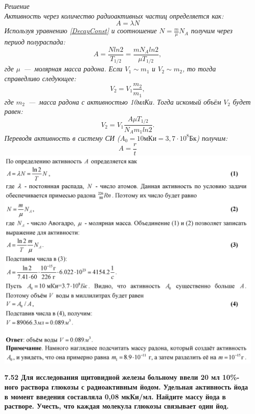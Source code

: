 \documentclass[a4paper, fontsize=14pt]{extreport}
\begin{document}
{\textit{Решение \\
Активность через количество радиоактивных частиц определяется как:
\begin{equation}
  A = \lambda N
\end{equation} 
Используя уравнению \ref{DecayConst} и соотношение $N = \frac{m}{\mu}N_A$ получим через период полураспада:
\begin{equation}
  A = \frac{N ln2}{T_{1/2}} = \frac{mN_A ln2}{\mu  T_{1/2}}, 
\end{equation} 
где $\mu$~---~молярная масса радона. 
Если $V_1 \sim m_1$ и $V_2 \sim m_2$, то тогда справедливо следующее:
\begin{equation}
  V_2 = V_1\frac{m_2}{m_1},
\end{equation} 
где $m_2$~---~масса радона с активностью 10млКи. Тогда искомый объём $V_2$ будет равен:
\begin{equation}
  V_2 = V_1\frac{A \mu  T_{1/2}}{N_A m_1 ln2 }.
\end{equation}
Переводя активность в систему СИ ($A_0 = 10 \text{мКи} =3,7 \cdot 10^8\text{Бк}$) получим:
\begin{equation}
  A = \frac{r}{t}
\end{equation}
}
\includegraphics[width=\textwidth]{748}

\textbf{7.52 Для исследования щитовидной железы больному ввели 20 мл 10\%-ного раствора глюкозы с радиоактивным йодом. Удельная активность йода в момент введения составляла 0,08 мкКи/мл. Найдите массу йода в растворе. Учесть, что каждая молекула глюкозы связывает один йод.}

}
\end{document}
